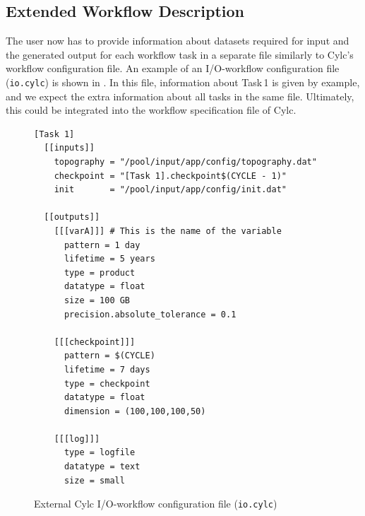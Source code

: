 \documentclass{superfri}
\begin{document}
\subsection{Extended Workflow Description}

The user now has to provide information about datasets required for input and the generated output for each workflow task in a separate file similarly to Cylc's workflow configuration file.
An example of an I/O-workflow configuration file (\texttt{io.cylc}) is shown in . In this file, information about Task\,1 is given by example, and we expect the extra information about all tasks in the same file. Ultimately, this could be integrated into the workflow specification file of Cylc.

\begin{figure}[!ht]

\begin{lstlisting}
[Task 1]
  [[inputs]]
    topography = "/pool/input/app/config/topography.dat"
    checkpoint = "[Task 1].checkpoint$(CYCLE - 1)"
    init       = "/pool/input/app/config/init.dat"

  [[outputs]]
    [[[varA]]] # This is the name of the variable
      pattern = 1 day
      lifetime = 5 years
      type = product
      datatype = float
      size = 100 GB
      precision.absolute_tolerance = 0.1

    [[[checkpoint]]]
      pattern = $(CYCLE)
      lifetime = 7 days
      type = checkpoint
      datatype = float
      dimension = (100,100,100,50)

    [[[log]]]
      type = logfile
      datatype = text
      size = small
\end{lstlisting}

\caption{External Cylc I/O-workflow configuration file (\texttt{io.cylc})}
\label{lst:cylc}
\end{figure}
\end{document}
